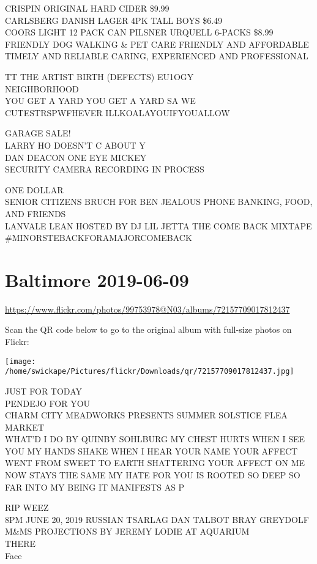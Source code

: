 \documentclass[10pt,letterpaper]{article}
\begin{document}
CRISPIN ORIGINAL HARD CIDER \$9.99\\
CARLSBERG DANISH LAGER 4PK TALL BOYS \$6.49\\
COORS LIGHT 12 PACK CAN PILSNER URQUELL 6{-}PACKS \$8.99\\
FRIENDLY DOG WALKING \& PET CARE FRIENDLY AND AFFORDABLE TIMELY AND RELIABLE CARING, EXPERIENCED AND PROFESSIONAL

TT THE ARTIST BIRTH (DEFECTS) EU1OGY\\
NEIGHBORHOOD\\
YOU GET A YARD YOU GET A YARD SA WE\\
CUTESTRSPWFHEVER ILLKOALAYOUIFYOUALLOW

GARAGE SALE!\\
LARRY HO DOESN'T C ABOUT Y\\
DAN DEACON ONE EYE MICKEY\\
SECURITY CAMERA RECORDING IN PROCESS

ONE DOLLAR\\
SENIOR CITIZENS BRUCH FOR BEN JEALOUS PHONE BANKING, FOOD, AND FRIENDS\\
LANVALE LEAN HOSTED BY DJ LIL JETTA THE COME BACK MIXTAPE \#MINORSTEBACKFORAMAJORCOMEBACK


\section*{Baltimore 2019-06-09}

\url{https://www.flickr.com/photos/99753978@N03/albums/72157709017812437}

Scan the QR code below to go to the original album with full-size photos on Flickr:

\texttt{[image: /home/swickape/Pictures/flickr/Downloads/qr/72157709017812437.jpg]}


JUST FOR TODAY\\
PENDEJO FOR YOU\\
CHARM CITY MEADWORKS PRESENTS SUMMER SOLSTICE FLEA MARKET\\
WHAT'D I DO BY QUINBY SOHLBURG MY CHEST HURTS WHEN I SEE YOU MY HANDS SHAKE WHEN I HEAR YOUR NAME YOUR AFFECT WENT FROM SWEET TO EARTH SHATTERING YOUR AFFECT ON ME NOW STAYS THE SAME MY HATE FOR YOU IS ROOTED SO DEEP SO FAR INTO MY BEING IT MANIFESTS AS P

RIP WEEZ\\
8PM JUNE 20, 2019 RUSSIAN TSARLAG DAN TALBOT BRAY GREYDOLF M\&MS PROJECTIONS BY JEREMY LODIE AT AQUARIUM\\
THERE\\
Face
\end{document}

